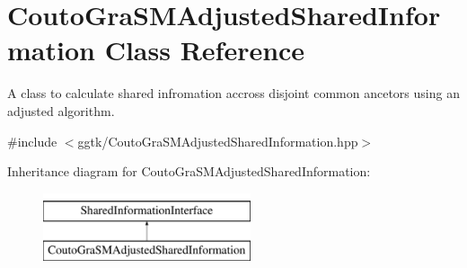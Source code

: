\hypertarget{classCoutoGraSMAdjustedSharedInformation}{}\section{Couto\+Gra\+S\+M\+Adjusted\+Shared\+Information Class Reference}
\label{classCoutoGraSMAdjustedSharedInformation}


A class to calculate shared infromation accross disjoint common ancetors using an adjusted algorithm.  




{\ttfamily \#include $<$ggtk/\+Couto\+Gra\+S\+M\+Adjusted\+Shared\+Information.\+hpp$>$}

Inheritance diagram for Couto\+Gra\+S\+M\+Adjusted\+Shared\+Information\+:\begin{figure}[H]
\begin{center}
\leavevmode
\includegraphics[height=2.000000cm]{classCoutoGraSMAdjustedSharedInformation}
\end{center}
\end{figure}
